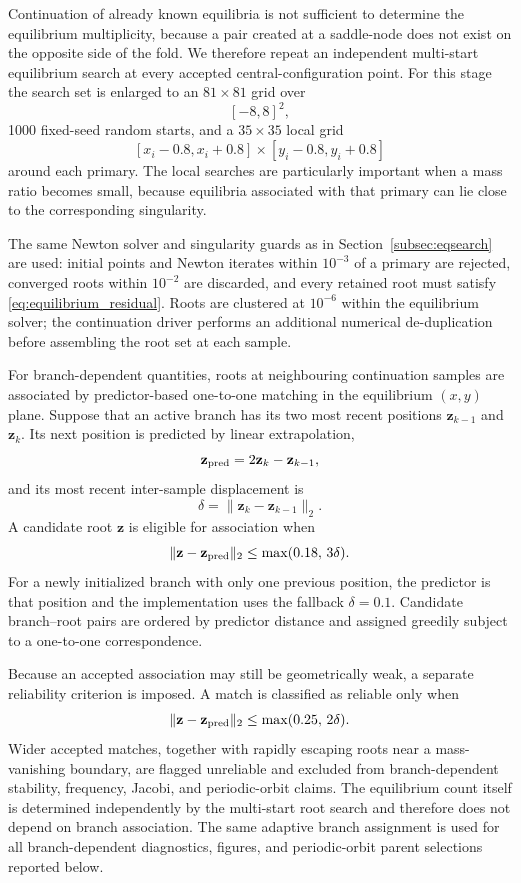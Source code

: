 Continuation of already known equilibria is not sufficient to determine
the equilibrium multiplicity, because a pair created at a saddle-node does
not exist on the opposite side of the fold. We therefore repeat an
independent multi-start equilibrium search at every accepted
central-configuration point. For this stage the search set is enlarged to
an $81\times81$ grid over
\[
[-8,8]^2,
\]
1000 fixed-seed random starts, and a $35\times35$ local grid
\[
[x_i-0.8,x_i+0.8]\times[y_i-0.8,y_i+0.8]
\]
around each primary. The local searches are particularly important when a
mass ratio becomes small, because equilibria associated with that primary
can lie close to the corresponding singularity.

The same Newton solver and singularity guards as in Section~\ref{subsec:eqsearch} are used:
initial points and Newton iterates within $10^{-3}$ of a primary are
rejected, converged roots within $10^{-2}$ are discarded, and every retained
root must satisfy \eqref{eq:equilibrium_residual}. Roots are clustered at
$10^{-6}$ within the equilibrium solver; the continuation driver performs
an additional numerical de-duplication before assembling the root set at
each sample.

For branch-dependent quantities, roots at neighbouring continuation samples
are associated by predictor-based one-to-one matching in the equilibrium
$(x,y)$ plane. Suppose that an active branch has its two most recent
positions $\mathbf z_{k-1}$ and $\mathbf z_k$. Its next position is predicted
by linear extrapolation,
\[
\mathbf z_{\rm pred}
=
2\mathbf z_k-\mathbf z_{k-1},
\]
and its most recent inter-sample displacement is
\[
\delta
=
\|\mathbf z_k-\mathbf z_{k-1}\|_2.
\]
A candidate root $\mathbf z$ is eligible for association when
\begin{equation}
\|\mathbf z-\mathbf z_{\rm pred}\|_2
\leq
\max(0.18,\,3\delta).
\label{eq:branch_match_tolerance}
\end{equation}
For a newly initialized branch with only one previous position, the
predictor is that position and the implementation uses the fallback
$\delta=0.1$. Candidate branch--root pairs are ordered by predictor distance
and assigned greedily subject to a one-to-one correspondence.

Because an accepted association may still be geometrically weak, a separate
reliability criterion is imposed. A match is classified as reliable only
when
\begin{equation}
\|\mathbf z-\mathbf z_{\rm pred}\|_2
\leq
\max(0.25,\,2\delta).
\label{eq:branch_reliability}
\end{equation}
Wider accepted matches, together with rapidly escaping roots near a
mass-vanishing boundary, are flagged unreliable and excluded from
branch-dependent stability, frequency, Jacobi, and periodic-orbit claims.
The equilibrium count itself is determined independently by the multi-start
root search and therefore does not depend on branch association. The same
adaptive branch assignment is used for all branch-dependent diagnostics,
figures, and periodic-orbit parent selections reported below.

